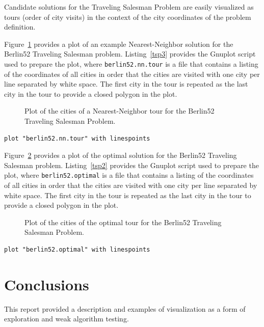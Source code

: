 \documentclass[a4paper, 11pt]{article}
\begin{document}
Candidate solutions for the Traveling Salesman Problem are easily visualized as tours (order of city visits) in the context of the city coordinates of the problem definition.

Figure~\ref{plot:tsp3} provides a plot of an example Nearest-Neighbor solution for the Berlin52 Traveling Salesman problem. Listing~\ref{tsp3} provides the Gnuplot script used to prepare the plot, where \texttt{berlin52.nn.tour} is a file that contains a listing of the coordinates of all cities in order that the cities are visited with one city per line separated by white space. The first city in the tour is repeated as the last city in the tour to provide a closed polygon in the plot.

\begin{figure}[htp]
\centering

\caption{Plot of the cities of a Nearest-Neighbor tour for the Berlin52 Traveling Salesman Problem.}
\label{plot:tsp3}
\end{figure}

\begin{lstlisting}[caption=Gnuplot script for plotting a tour for a Traveling Salesman Problem., label=tsp3]
plot "berlin52.nn.tour" with linespoints
\end{lstlisting}

Figure~\ref{plot:tsp2} provides a plot of the optimal solution for the Berlin52 Traveling Salesman problem. Listing~\ref{tsp2} provides the Gnuplot script used to prepare the plot, where \texttt{berlin52.optimal} is a file that contains a listing of the coordinates of all cities in order that the cities are visited with one city per line separated by white space. The first city in the tour is repeated as the last city in the tour to provide a closed polygon in the plot.

\begin{figure}[htp]
\centering

\caption{Plot of the cities of the optimal tour for the Berlin52 Traveling Salesman Problem.}
\label{plot:tsp2}
\end{figure}

\begin{lstlisting}[caption=Gnuplot script for plotting a tour for a Traveling Salesman Problem., label=tsp2]
plot "berlin52.optimal" with linespoints
\end{lstlisting}

%
%
\section{Conclusions}
\label{sec:conclusions}
This report provided a description and examples of visualization as a form of exploration and weak algorithm testing. 



\end{document}
